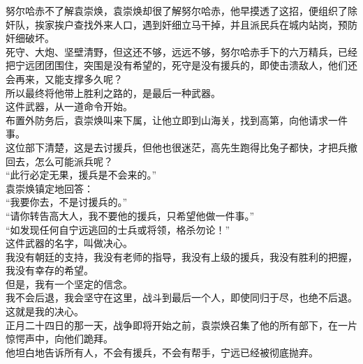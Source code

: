\begin{multicols}{\theparacolNo}
努尔哈赤不了解袁崇焕，袁崇焕却很了解努尔哈赤，他早摸透了这招，便组织了除奸队，挨家挨户查找外来人口，遇到奸细立马干掉，并且派民兵在城内站岗，预防奸细破坏。\\

死守、大炮、坚壁清野，但这还不够，远远不够，努尔哈赤手下的六万精兵，已经把宁远团团围住，突围是没有希望的，死守是没有援兵的，即使击溃敌人，他们还会再来，又能支撑多久呢？\\

所以最终将他带上胜利之路的，是最后一种武器。\\

这件武器，从一道命令开始。\\

布置外防务后，袁崇焕叫来下属，让他立即到山海关，找到高第，向他请求一件事。\\

这位部下清楚，这是去讨援兵，但他也很迷茫，高先生跑得比兔子都快，才把兵撤回去，怎么可能派兵呢？\\

“此行必定无果，援兵是不会来的。”\\

袁崇焕镇定地回答：\\

“我要你去，不是讨援兵的。”\\

“请你转告高大人，我不要他的援兵，只希望他做一件事。”\\

“如发现任何自宁远逃回的士兵或将领，格杀勿论！”\\

这件武器的名字，叫做决心。\\

我没有朝廷的支持，我没有老师的指导，我没有上级的援兵，我没有胜利的把握，我没有幸存的希望。\\

但是，我有一个坚定的信念。\\

我不会后退，我会坚守在这里，战斗到最后一个人，即使同归于尽，也绝不后退。\\

这就是我的决心。\\

正月二十四日的那一天，战争即将开始之前，袁崇焕召集了他的所有部下，在一片惊愕声中，向他们跪拜。\\

他坦白地告诉所有人，不会有援兵，不会有帮手，宁远已经被彻底抛弃。\\


\end{multicols}
